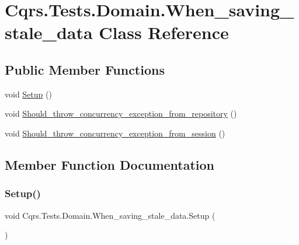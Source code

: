 \hypertarget{classCqrs_1_1Tests_1_1Domain_1_1When__saving__stale__data}{}\section{Cqrs.\+Tests.\+Domain.\+When\+\_\+saving\+\_\+stale\+\_\+data Class Reference}
\label{classCqrs_1_1Tests_1_1Domain_1_1When__saving__stale__data}
\subsection*{Public Member Functions}
\begin{DoxyCompactItemize}
\item 
void \hyperlink{classCqrs_1_1Tests_1_1Domain_1_1When__saving__stale__data_a69d264e3f5981aca77b3523c7ca7a510_a69d264e3f5981aca77b3523c7ca7a510}{Setup} ()
\item 
void \hyperlink{classCqrs_1_1Tests_1_1Domain_1_1When__saving__stale__data_a6d2f729c473fd0d44db49979b64fbcde_a6d2f729c473fd0d44db49979b64fbcde}{Should\+\_\+throw\+\_\+concurrency\+\_\+exception\+\_\+from\+\_\+repository} ()
\item 
void \hyperlink{classCqrs_1_1Tests_1_1Domain_1_1When__saving__stale__data_af768e1143a492a82adabdd21e741525f_af768e1143a492a82adabdd21e741525f}{Should\+\_\+throw\+\_\+concurrency\+\_\+exception\+\_\+from\+\_\+session} ()
\end{DoxyCompactItemize}


\subsection{Member Function Documentation}
\mbox{\label{classCqrs_1_1Tests_1_1Domain_1_1When__saving__stale__data_a69d264e3f5981aca77b3523c7ca7a510_a69d264e3f5981aca77b3523c7ca7a510}} 
\subsubsection{\texorpdfstring{Setup()}{Setup()}}
{\footnotesize\ttfamily void Cqrs.\+Tests.\+Domain.\+When\+\_\+saving\+\_\+stale\+\_\+data.\+Setup (\begin{DoxyParamCaption}{ }\end{DoxyParamCaption})}

